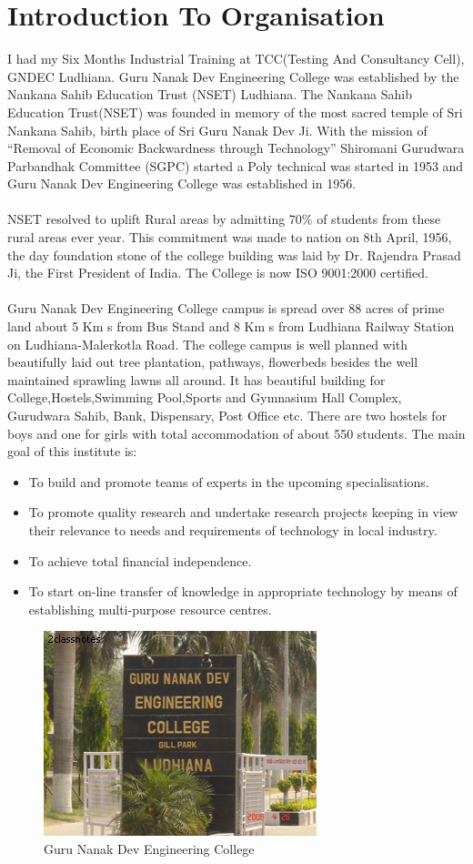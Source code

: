 \section{Introduction To Organisation}
I had my Six Months Industrial Training at TCC(Testing And Consultancy Cell), GNDEC
Ludhiana. Guru Nanak Dev Engineering College was established by the Nankana Sahib
Education Trust (NSET) Ludhiana. The Nankana Sahib Education Trust(NSET) was founded in
memory of the most sacred temple of Sri Nankana Sahib, birth place of Sri Guru Nanak Dev Ji.
With the mission of “Removal of Economic Backwardness through Technology” Shiromani
Gurudwara Parbandhak Committee (SGPC) started a Poly technical was started in 1953 and
Guru Nanak Dev Engineering College was established in 1956.\\\\
NSET resolved to uplift Rural areas by admitting 70\% of students from these rural areas ever
year. This commitment was made to nation on 8th April, 1956, the day foundation stone of the
college building was laid by Dr. Rajendra Prasad Ji, the First President of India. The College is
now ISO 9001:2000 certified.\\\\
Guru Nanak Dev Engineering College campus is spread over 88 acres of prime land about 5
Km s from Bus Stand and 8 Km s from Ludhiana Railway Station on Ludhiana-Malerkotla
Road. The college campus is well planned with beautifully laid out tree plantation, pathways,
flowerbeds besides the well maintained sprawling lawns all around. It has beautiful building for
College,Hostels,Swimming Pool,Sports and Gymnasium Hall Complex, Gurudwara Sahib,
Bank, Dispensary, Post Office etc. There are two hostels for boys and one for girls with total
accommodation of about 550 students. The main goal of this institute is:\\
\begin{itemize}
\item To build and promote teams of experts in the upcoming specialisations.
\item To promote quality research and undertake research projects keeping in view their
relevance to needs and requirements of technology in local industry.
\item To achieve total financial independence.
\item To start on-line transfer of knowledge in appropriate technology by means of
establishing multi-purpose resource centres.
\end{itemize}
\begin{figure}[h]
\centering \includegraphics[scale=0.9]{gndec.jpg}
\caption[GNDEC]{Guru Nanak Dev Engineering College}
\end{figure}
